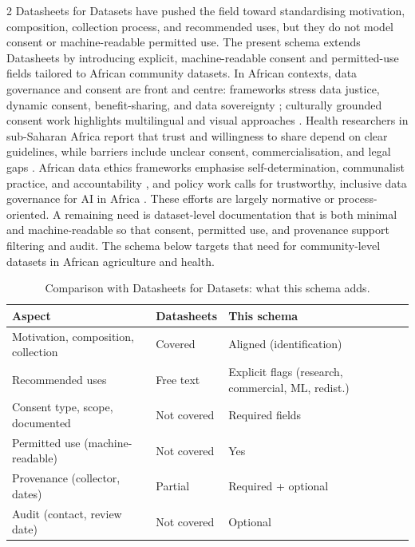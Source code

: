 \documentclass[11pt]{article}
\begin{document}
\begin{multicols}{2}
Datasheets for Datasets \cite{gebru2021} have pushed the field toward standardising motivation, composition, collection process, and recommended uses, but they do not model consent or machine-readable permitted use. The present schema extends Datasheets by introducing explicit, machine-readable consent and permitted-use fields tailored to African community datasets. In African contexts, data governance and consent are front and centre: frameworks stress data justice, dynamic consent, benefit-sharing, and data sovereignty \cite{munung2025}; culturally grounded consent work highlights multilingual and visual approaches \cite{omutoko2024}. Health researchers in sub-Saharan Africa report that trust and willingness to share depend on clear guidelines, while barriers include unclear consent, commercialisation, and legal gaps \cite{brown2024,chabilall2024}. African data ethics frameworks emphasise self-determination, communalist practice, and accountability \cite{barrett2025,abebe2021}, and policy work calls for trustworthy, inclusive data governance for AI in Africa \cite{effoduh2024}. These efforts are largely normative or process-oriented. A remaining need is dataset-level documentation that is both minimal and machine-readable so that consent, permitted use, and provenance support filtering and audit. The schema below targets that need for community-level datasets in African agriculture and health.

\begin{table}[t]
\centering
\caption{Comparison with Datasheets for Datasets: what this schema adds.}
\label{tab:vs-datasheets}
\small
\begin{tabular}{@{}lll@{}}
\toprule
Aspect & Datasheets \cite{gebru2021} & This schema \\
\midrule
Motivation, composition, collection & Covered & Aligned (identification) \\
Recommended uses & Free text & Explicit flags (research, commercial, ML, redist.) \\
Consent type, scope, documented & Not covered & Required fields \\
Permitted use (machine-readable) & Not covered & Yes \\
Provenance (collector, dates) & Partial & Required + optional \\
Audit (contact, review date) & Not covered & Optional \\
\bottomrule
\end{tabular}
\end{table}


\end{multicols}
\end{document}
